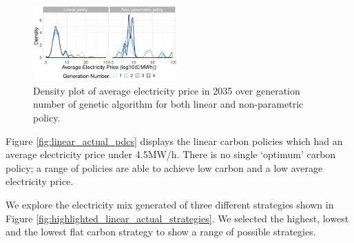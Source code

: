 \documentclass[sigconf]{acmart}
\begin{document}
\begin{figure}
\centering
\includegraphics[width=0.49\textwidth,]{figures/results/linear_and_free_ga_development_distribution_avg_elec_price.pdf}
\caption{Density plot of average electricity price in 2035 over generation number of genetic algorithm for both linear and non-parametric policy.}
\label{fig:comparison_of_distributions}
\end{figure}

Figure \ref{fig:linear_actual_pdcs} displays the linear carbon policies which had an average electricity price under \textsterling4.5MW/h. There is no single `optimum' carbon policy; a range of policies are able to achieve low carbon and a low average electricity price.


We explore the electricity mix generated of three different strategies shown in Figure \ref{fig:highlighted_linear_actual_strategies}. We selected the highest, lowest and the lowest flat carbon strategy to show a range of possible strategies.

%
\end{document}
